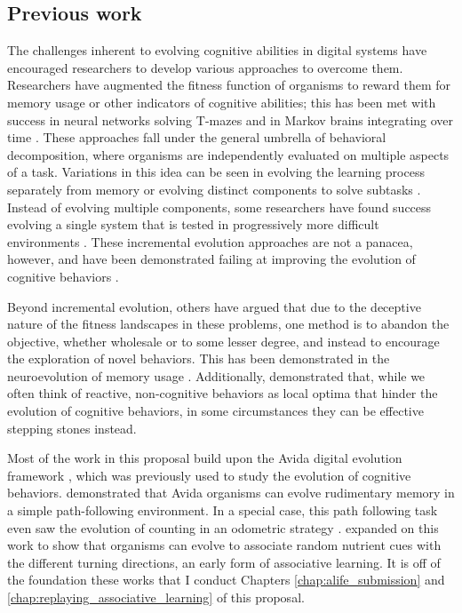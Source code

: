 \subsection{Previous work}

The challenges inherent to evolving cognitive abilities in digital systems have encouraged researchers to develop various approaches to overcome them.
Researchers have augmented the fitness function of organisms to reward them for memory usage or other indicators of cognitive abilities; this has been met with success in neural networks solving T-mazes \citep{ollionLittleHelpSelection2012} and in Markov brains integrating over time \citep{schossauInformationTheoreticNeuroCorrelatesBoost2016}. 
These approaches fall under the general umbrella of behavioral decomposition, where organisms are independently evaluated on multiple aspects of a task.
Variations in this idea can be seen in evolving the learning process separately from memory \citep{nordinEvolutionWorldModel1998} or evolving distinct components to solve subtasks \citep{duarteHierarchicalEvolutionRobotic2012}.
Instead of evolving multiple components, some researchers have found success evolving a single system that is tested in progressively more difficult environments \citep{gomezIncrementalEvolutionComplex1997}.
These incremental evolution approaches are not a panacea, however, and have been demonstrated failing at improving the evolution of cognitive behaviors \citep{christensenIncrementalEvolutionRobot2006}. 

Beyond incremental evolution, others have argued that due to the deceptive nature of the fitness landscapes in these problems, one method is to abandon the objective, whether wholesale or to some lesser degree, and instead to encourage the exploration of novel behaviors. 
This has been demonstrated in the neuroevolution of memory usage \citep{lehmanOvercomingDeceptionEvolution2014}.
Additionally, \citet{carvalhoCognitiveOffloadingDoes2016} demonstrated that, while we often think of reactive, non-cognitive behaviors as local optima that hinder the evolution of cognitive behaviors, in some circumstances they can be effective stepping stones instead.


Most of the work in this proposal build upon the Avida digital evolution framework \citep{ofriaAvidaSoftwarePlatform2004a}, which was previously used to study the evolution of cognitive behaviors. 
\citet{grabowskiEarlyEvolutionMemory2010a} demonstrated that Avida organisms can evolve rudimentary memory in a simple path-following environment. 
In a special case, this path following task even saw the evolution of counting in an odometric strategy \citep{grabowskiCaseStudyNovo2013}.
\citet{pontesEvolutionaryOriginAssociative2020} expanded on this work to show that organisms can evolve to associate random nutrient cues with the different turning directions, an early form of associative learning. 
It is off of the foundation these works that I conduct Chapters \ref{chap:alife_submission} and \ref{chap:replaying_associative_learning} of this proposal. 

